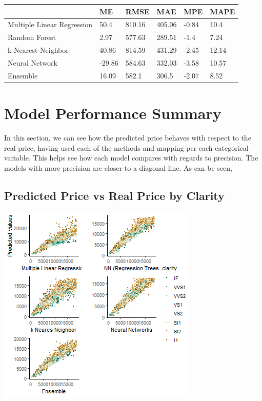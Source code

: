 \documentclass[
  paper=a4,
  ,captions=tableheading
]{scrartcl}
\begin{document}
\begin{table}[!h]
\centering
\begin{tabu} to 
\hline
  & ME & RMSE & MAE & MPE & MAPE\\
\hline
Multiple Linear Regression & 50.4 & 810.16 & 405.06 & -0.84 & 10.4\\
\hline
Random Forest & 2.97 & 577.63 & 289.51 & -1.4 & 7.24\\
\hline
k-Nearest Neighbor & 40.86 & 814.59 & 431.29 & -2.45 & 12.14\\
\hline
Neural Network & -29.86 & 584.63 & 332.03 & -3.58 & 10.57\\
\hline
Ensemble & 16.09 & 582.1 & 306.5 & -2.07 & 8.52\\
\hline
\end{tabu}
\end{table}

\hypertarget{model-performance-summary}{%
\section{Model Performance Summary}\label{model-performance-summary}}

In this section, we can see how the predicted price behaves with respect
to the real price, having used each of the methods and mapping per each
categorical variable. This helps see how each model compares with
regards to precision. The models with more precision are closer to a
diagonal line. As can be seen,

\hypertarget{predicted-price-vs-real-price-by-clarity}{%
\subsection{Predicted Price vs Real Price by
Clarity}\label{predicted-price-vs-real-price-by-clarity}}

\begin{center}\includegraphics{Diamonds_PDF_files/figure-latex/Ensemble Summary Plot-1} \end{center}
\end{document}
